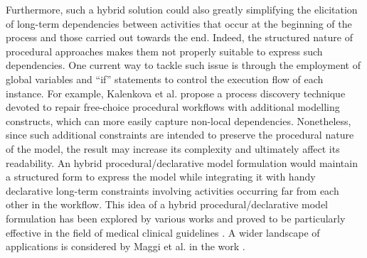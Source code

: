 \documentclass[a4wide,11pt]{article}
\theoremstyle{definition}
\theoremstyle{plain}
\begin{document}
Furthermore, such a hybrid solution could also greatly simplifying the elicitation of long-term dependencies between activities that occur at the beginning of the process and those carried out towards the end. Indeed, the structured nature of procedural approaches makes them not properly suitable to express such dependencies.
One current way to tackle such issue is through the employment of global variables and ``if'' statements to control the execution flow of each instance. For example, Kalenkova et al. \cite{2020-Kalenkova} propose a process discovery technique devoted to repair free-choice procedural workflows with additional modelling constructs, which can more easily capture non-local dependencies. Nonetheless, since such additional constraints are intended to preserve the procedural nature of the model, the result may increase its complexity and ultimately affect its readability.
An hybrid procedural/declarative model formulation would maintain a structured form to express the model while integrating it with handy declarative long-term constraints involving activities occurring far from each other in the workflow.
%
%
This idea of a hybrid procedural/declarative model formulation has been explored by various works and proved to be particularly effective in the field of medical clinical guidelines \cite{2009a-Bottrighi,2009b-Bottrighi, 2011-Bottrighi}. A wider landscape of applications is considered by Maggi et al. in the work \cite{2018b-Maggi}. %
\end{document}
